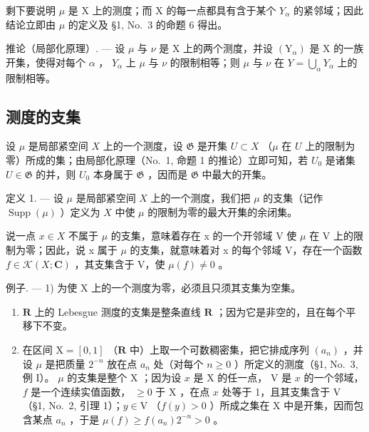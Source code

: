 剩下要说明 \(\mu\) 是 X 上的测度；而 X 的每一点都具有含于某个 \(Y_{\alpha}\) 的紧邻域；因此结论立即由 \(\mu\) 的定义及 §1, No.~3 的命题 6 得出。

推论（局部化原理）. --- 设 \(\mu\) 与 \(\nu\) 是 X 上的两个测度，并设 \((\mathrm{Y}_{\alpha})\) 是 X 的一族开集，使得对每个 \(\alpha\) ， \(Y_{\alpha}\) 上 \(\mu\) 与 \(\nu\) 的限制相等；则 \(\mu\) 与 \(\nu\) 在 \(Y = \bigcup_{\alpha} Y_{\alpha}\) 上的限制相等。

\subsection{测度的支集}

设 \(\mu\) 是局部紧空间 \(X\) 上的一个测度，设 \(\mathfrak{G}\) 是开集 \(U \subset X\) （\(\mu\) 在 \(U\) 上的限制为零）所成的集；由局部化原理（No.~1, 命题 1 的推论）立即可知，若 \(U_0\) 是诸集 \(U \in \mathfrak{G}\) 的并，则 \(U_0\) 本身属于 \(\mathfrak{G}\) ，因而是 \(\mathfrak{G}\) 中最大的开集。

定义 1. --- 设 \(\mu\) 是局部紧空间 \(X\) 上的一个测度，我们把 \(\mu\) 的支集（记作 \(\operatorname{Supp}(\mu)\) ）定义为 \(X\) 中使 \(\mu\) 的限制为零的最大开集的余闭集。

说一点 \(x \in X\) 不属于 \(\mu\) 的支集，意味着存在 x 的一个开邻域 V 使 \(\mu\) 在 V 上的限制为零；因此，说 x 属于 \(\mu\) 的支集，就意味着对 x 的每个邻域 V，存在一个函数 \(f \in \mathcal{K}(X; \mathbf{C})\) ，其支集含于 V，使 \(\mu(f) \neq 0\) 。

例子. --- 1) 为使 X 上的一个测度为零，必须且只须其支集为空集。

\begin{enumerate}
\def\labelenumi{\arabic{enumi})}
\setcounter{enumi}{1}
\item
  \(\mathbf{R}\) 上的 Lebesgue 测度的支集是整条直线 \(\mathbf{R}\) ；因为它是非空的，且在每个平移下不变。
\item
  在区间 \(\mathrm{X} = [0,1]\) （\(\mathbf{R}\) 中）上取一个可数稠密集，把它排成序列 \((a_n)\) ，并设 \(\mu\) 是把质量 \(2^{-n}\) 放在点 \(a_n\) 处（对每个 \(n \geqslant 0\) ）所定义的测度（§1, No.~3, 例 I）。 \(\mu\) 的支集是整个 \(\mathrm{X}\) ；因为设 \(x\) 是 \(\mathrm{X}\) 的任一点， \(\mathrm{V}\) 是 \(x\) 的一个邻域， \(f\) 是一个连续实值函数， \(\geqslant 0\) 于 \(\mathrm{X}\) ，在点 \(x\) 处等于 1，且其支集含于 \(\mathrm{V}\) （§1, No.~2, 引理 1）；\(y \in \mathrm{V}\) （\(f(y) > 0\) ）所成之集在 \(\mathrm{X}\) 中是开集，因而包含某点 \(a_n\) ，于是 \(\mu(f) \geqslant f(a_n)2^{-n} > 0\) 。
\end{enumerate}

